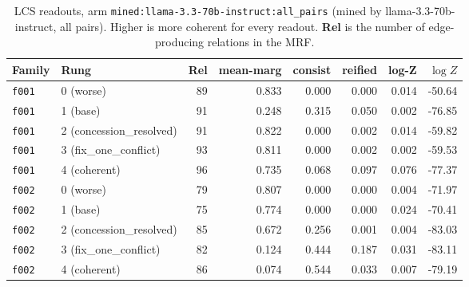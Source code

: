 \documentclass[11pt]{article}
\begin{document}
\begin{table}[htbp]
\centering
\small
\caption{LCS readouts, arm \texttt{mined:llama-3.3-70b-instruct:all\_pairs} (mined by llama-3.3-70b-instruct, all pairs). Higher is more coherent for every readout. \textbf{Rel} is the number of edge-producing relations in the MRF.}
\label{tab:scores-mined-llama-3-3-70b-instruct-all-pairs}
\begin{tabular}{llrrrrrr}
\toprule
Family & Rung & Rel & \textbf{mean-marg} & \textbf{consist} & \textbf{reified} & \textbf{log-Z} & $\log Z$ \\
\midrule
\texttt{f001} & 0 (worse) & 89 & 0.833 & 0.000 & 0.000 & 0.014 & -50.64 \\
\texttt{f001} & 1 (base) & 91 & 0.248 & 0.315 & 0.050 & 0.002 & -76.85 \\
\texttt{f001} & 2 (concession\_resolved) & 91 & 0.822 & 0.000 & 0.002 & 0.014 & -59.82 \\
\texttt{f001} & 3 (fix\_one\_conflict) & 93 & 0.811 & 0.000 & 0.002 & 0.002 & -59.53 \\
\texttt{f001} & 4 (coherent) & 96 & 0.735 & 0.068 & 0.097 & 0.076 & -77.37 \\
\midrule
\texttt{f002} & 0 (worse) & 79 & 0.807 & 0.000 & 0.000 & 0.004 & -71.97 \\
\texttt{f002} & 1 (base) & 75 & 0.774 & 0.000 & 0.000 & 0.024 & -70.41 \\
\texttt{f002} & 2 (concession\_resolved) & 85 & 0.672 & 0.256 & 0.001 & 0.004 & -83.03 \\
\texttt{f002} & 3 (fix\_one\_conflict) & 82 & 0.124 & 0.444 & 0.187 & 0.031 & -83.11 \\
\texttt{f002} & 4 (coherent) & 86 & 0.074 & 0.544 & 0.033 & 0.007 & -79.19 \\
\bottomrule
\end{tabular}
\end{table}
\end{document}
